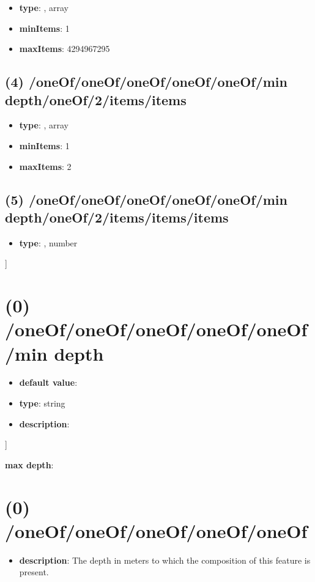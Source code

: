 \begin{itemize}[leftmargin=3em]\item {\bf type}: , array\item {\bf minItems}: 1
\item {\bf maxItems}: 4294967295
\end{itemize}\subsection{(4) /oneOf/oneOf/oneOf/oneOf/oneOf/min depth/oneOf/2/items/items}
\begin{itemize}[leftmargin=4em]\item {\bf type}: , array\item {\bf minItems}: 1
\item {\bf maxItems}: 2
\end{itemize}\subsection{(5) /oneOf/oneOf/oneOf/oneOf/oneOf/min depth/oneOf/2/items/items/items}
\begin{itemize}[leftmargin=5em]\item {\bf type}: , number\end{itemize}]\section{(0) /oneOf/oneOf/oneOf/oneOf/oneOf/min depth}
\begin{itemize}[leftmargin=0em]\item {\bf default value}: 
\item {\bf type}: string
\item {\bf description}: 
\end{itemize}]\item {\bf max depth}: \section{(0) /oneOf/oneOf/oneOf/oneOf/oneOf}
\begin{itemize}[leftmargin=0em]\item {\bf description}: The depth in meters to which the composition of this feature is present.
\end{itemize}
